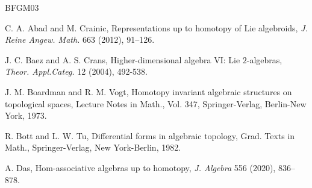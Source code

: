 \documentclass[a4paper,reqno,10pt]{amsart}
\theoremstyle{plain}
\theoremstyle{definition}
\theoremstyle{remark}
\begin{document}
    
\begin{thebibliography}{BFGM03}

 C. A. Abad and M. Crainic, Representations up to homotopy of Lie algebroids, {\em J. Reine Angew. Math.} 663 (2012), 91–126.


    J. C. Baez and A. S. Crans, Higher-dimensional algebra VI: Lie $2$-algebras, {\em Theor. Appl.Categ.} 12 (2004), 492-538.





 J. M. Boardman and R. M. Vogt, Homotopy invariant algebraic structures on topological spaces, Lecture Notes in Math., Vol. 347, Springer-Verlag, Berlin-New York, 1973.



  R. Bott and L. W. Tu, Differential forms in algebraic topology, Grad. Texts in Math., Springer-Verlag, New York-Berlin, 1982.



  A. Das, Hom-associative algebras up to homotopy, {\em J. Algebra} 556 (2020), 836–878.



\end{thebibliography}
\end{document}
